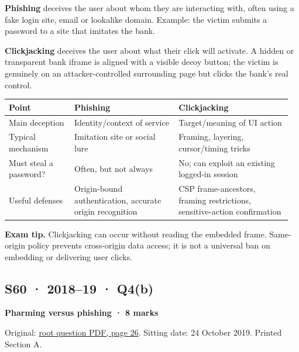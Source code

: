 \documentclass[11pt,a4paper]{article}
\begin{document}
\textbf{Phishing} deceives the user about whom they are interacting with,\allowbreak{} often using a fake login site,\allowbreak{} email or lookalike domain. Example: the victim submits a password to a site that imitates the bank.


\textbf{Clickjacking} deceives the user about what their click will activate. A hidden or transparent bank iframe is aligned with a visible decoy button; the victim is genuinely on an attacker-controlled surrounding page but clicks the bank’s real control.



{\small\setlength{\tabcolsep}{3pt}
\begin{longtable}{>{\raggedright\arraybackslash}p{0.22215\linewidth}>{\raggedright\arraybackslash}p{0.35443\linewidth}>{\raggedright\arraybackslash}p{0.38185\linewidth}}
\toprule
\textbf{Point} & \textbf{Phishing} & \textbf{Clickjacking} \\
\midrule
\endhead
Main deception & Identity/\allowbreak{}context of service & Target/\allowbreak{}meaning of UI action \\
Typical mechanism & Imitation site or social lure & Framing,\allowbreak{} layering,\allowbreak{} cursor/\allowbreak{}timing tricks \\
Must steal a password? & Often,\allowbreak{} but not always & No; can exploit an existing logged-in session \\
Useful defenses & Origin-bound authentication,\allowbreak{} accurate origin recognition & CSP frame-ancestors,\allowbreak{} framing restrictions,\allowbreak{} sensitive-action confirmation \\
\bottomrule
\end{longtable}
}


{\color{ForestGreen}\textbf{Exam tip.} Clickjacking can occur without reading the embedded frame. Same-origin policy prevents cross-origin data access; it is not a universal ban on embedding or delivering user clicks.}




\clearpage
\subsection{S60 · 2018–19 · Q4(b)}\label{s60}

\textbf{Pharming versus phishing · 8 marks}


Original: \href{../../CSE405-Security_Merged.pdf\#page=26}{root question PDF,\allowbreak{} page 26}. Sitting date: 24 October 2019. Printed Section A.
\end{document}
